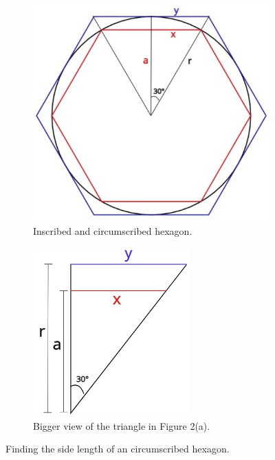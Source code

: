 \documentclass{article}
\begin{document}
\begin{figure}[h]
     \centering
     \begin{subfigure}[b]{0.4\textwidth}
         \centering
         \includegraphics[width=\textwidth]{figure2.jpeg}
         \caption{Inscribed and circumscribed hexagon.}
     \end{subfigure}
     \hfill
     \begin{subfigure}[b]{0.5\textwidth}
         \centering
         \includegraphics[width=6cm]{figure3.jpeg}
         \caption{Bigger view of the triangle in Figure 2(a).}
     \end{subfigure}
     \caption{Finding the side length of an circumscribed hexagon.}
     \label{fig:2}
\end{figure}
\end{document}
